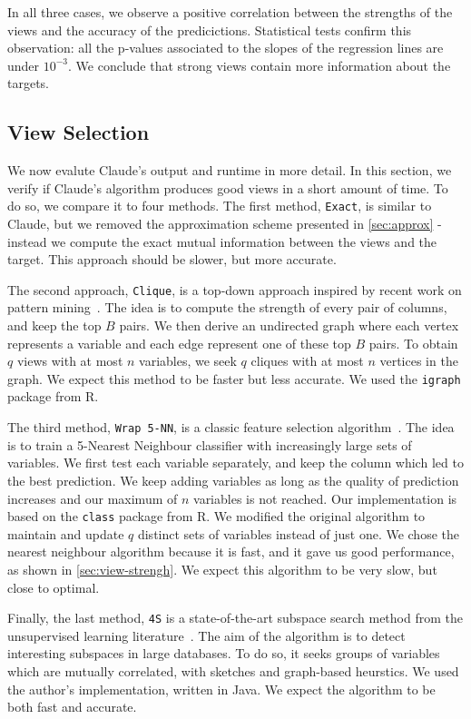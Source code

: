 In all three cases, we observe a positive correlation between the strengths of
the views and the accuracy of the predicictions. Statistical tests confirm this
observation: all the p-values associated to the slopes of the regression lines
are under $10^{-3}$. We conclude that strong views contain more information
about the targets.


\subsection{View Selection}
\label{sec:exp-view-selection}

We now evalute Claude's output and runtime in more detail. In this section, we
verify if Claude's algorithm produces good views in a short amount of time. To
do so, we compare it to four methods. The first method, \texttt{Exact}, is
similar to Claude, but we removed the approximation scheme presented in
\ref{sec:approx} - instead we compute the exact mutual information between the
views and the target. This approach should be slower, but more accurate. 

The second approach, \texttt{Clique}, is a top-down approach inspired by recent
work on pattern mining~\cite{xie2010max}. The idea is to compute the strength
of every pair of columns, and keep the top $B$ pairs.  We then derive an
undirected graph where each vertex represents a variable and each edge
represent one of these top $B$ pairs. To obtain $q$ views with at most $n$
variables, we seek $q$ cliques with at most $n$ vertices in the graph.  We
expect this method to be faster but less accurate. We used the \texttt{igraph}
package from R.

The third method, \texttt{Wrap 5-NN}, is a classic feature selection
algorithm~\cite{guyon2003introduction}. The idea is to train a 5-Nearest
Neighbour classifier with increasingly large sets of variables. We first test
each variable separately, and keep the column which led to the best prediction.
We keep adding variables as long as the quality of prediction increases and our
maximum of $n$ variables is not reached.  Our implementation is based on the
\texttt{class} package from R.  We modified the original algorithm to maintain
and update $q$ distinct sets of variables instead of just one. We chose the
nearest neighbour algorithm because it is fast, and it gave us good
performance, as shown in \ref{sec:view-strengh}. We expect this algorithm to be
very slow, but close to optimal.

Finally, the last method, \texttt{4S} is a state-of-the-art subspace search
method from the unsupervised learning literature~\cite{nguyen20134s}. The aim
of the algorithm is to detect interesting subspaces in large databases. To
do so, it seeks groups of variables which are mutually correlated, with
sketches and graph-based heurstics.  We used the author's implementation,
written in Java. We expect the algorithm to be both fast and accurate.

